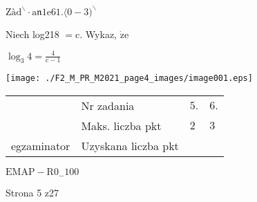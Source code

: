 \documentclass[a4paper,12pt]{article}
\begin{document}
$\mathrm{Z}\text{à} \mathrm{d}^{\backslash }\cdot \mathrm{a}\mathfrak{n}1\mathrm{e}61. \langle 0-3)^{\backslash }$

Niech log218 $= \mathrm{c}$. Wykaz, $\dot{\mathrm{z}}\mathrm{e}$

$\log_{3}4 =\displaystyle \frac{4}{\mathrm{c}-1}$
\begin{center}
\texttt{[image: ./F2\_M\_PR\_M2021\_page4\_images/image001.eps]}

\begin{tabular}{|l|l|l|l|}
\cline{2-4}
&	\multicolumn{1}{|l|}{Nr zadania}&	\multicolumn{1}{|l|}{$5.$}&	\multicolumn{1}{|l|}{ $6.$}	\\
\cline{2-4}
&	\multicolumn{1}{|l|}{Maks. liczba pkt}&	\multicolumn{1}{|l|}{$2$}&	\multicolumn{1}{|l|}{ $3$}	\\
\cline{2-4}
\multicolumn{1}{|l|}{egzaminator}&	\multicolumn{1}{|l|}{Uzyskana liczba pkt}&	\multicolumn{1}{|l|}{}&	\multicolumn{1}{|l|}{}	\\
\hline
\end{tabular}

\end{center}
$\mathrm{E}\mathrm{M}\mathrm{A}\mathrm{P}-\mathrm{R}0_{-}100$

Strona 5 z27
\end{document}
